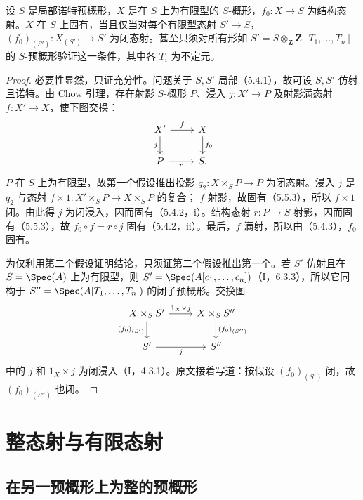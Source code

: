 设 $S$ 是局部诺特预概形，$X$ 是在 $S$ 上为有限型的 $S$-概形，$f_0:X\to S$ 为结构态射。$X$ 在 $S$ 上固有，当且仅当对每个有限型态射 $S'\to S$，
$(f_0)_{(S')}:X_{(S')}\to S'$ 为闭态射。甚至只须对所有形如
$S'=S\otimes_{\mathbf Z}\mathbf Z[T_1,\ldots,T_n]$ 的 $S$-预概形验证这一条件，其中各 $T_i$ 为不定元。
\begin{proof}
必要性显然，只证充分性。问题关于 $S,S'$ 局部（5.4.1），故可设 $S,S'$ 仿射且诺特。由 Chow 引理，存在射影 $S$-概形 $P$、浸入 $j:X'\to P$ 及射影满态射 $f:X'\to X$，使下图交换：
\[
\begin{tikzcd}
X'\arrow[r,"f"]\arrow[d,"j"']&X\arrow[d,"f_0"]\\
P\arrow[r,"r"']&S.
\end{tikzcd}
\]
$P$ 在 $S$ 上为有限型，故第一个假设推出投影 $q_2:X\times_S P\to P$ 为闭态射。浸入 $j$ 是 $q_2$ 与态射
$f\times1:X'\times_S P\to X\times_S P$ 的复合；
$f$ 射影，故固有（5.5.3），所以 $f\times1$ 闭。由此得 $j$ 为闭浸入，因而固有（5.4.2，i）。结构态射 $r:P\to S$ 射影，因而固有（5.5.3），故
$f_0\circ f=r\circ j$ 固有（5.4.2，ii）。最后，$f$ 满射，所以由（5.4.3），$f_0$ 固有。

为仅利用第二个假设证明结论，只须证第二个假设推出第一个。若 $S'$ 仿射且在 $S=\Spec(A)$ 上为有限型，则
$S'=\Spec(A[c_1,\ldots,c_n])$（I，6.3.3），所以它同构于
$S''=\Spec(A[T_1,\ldots,T_n])$ 的闭子预概形。交换图
\[
\begin{tikzcd}
X\times_S S'\arrow[r,"1_X\times j"]\arrow[d,"(f_0)_{(S')}"']&X\times_S S''\arrow[d,"(f_0)_{(S'')}"]\\
S'\arrow[r,"j"']&S''
\end{tikzcd}
\]
中的 $j$ 和 $1_X\times j$ 为闭浸入（I，4.3.1）。原文接着写道：按假设 $(f_0)_{(S')}$ 闭，故 $(f_0)_{(S'')}$ 也闭。
\end{proof}

\section{整态射与有限态射}
\subsection{在另一预概形上为整的预概形}


